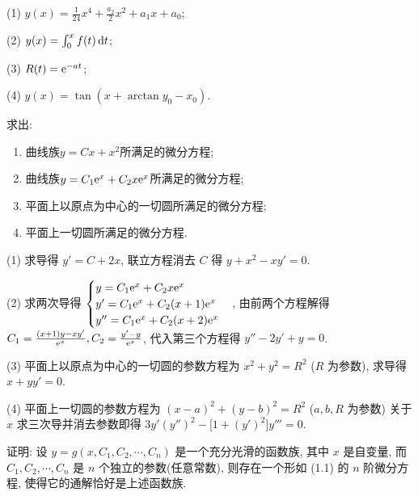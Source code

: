 \begin{solve}
  (1) $y(x)=\frac{1}{24}x^4+\frac{a_2}{2}x^2+a_1x+a_0$;

  (2) $y(x)=\int_0^xf(t)\mathop{}\!\mathrm{d} t$;

  (3) $R(t)=\mathrm{e}^{-at}$;

  (4) $y(x)=\tan(x+\arctan y_0-x_0)$.
\end{solve}



\begin{exercise}
  求出:
  \begin{enumerate}[(1)]
  \item 曲线族$y=Cx+x^2$所满足的微分方程;
  \item 曲线族$y=C_1\mathrm{e}^x+C_2x\mathrm{e}^x$所满足的微分方程;
  \item 平面上以原点为中心的一切圆所满足的微分方程;
  \item 平面上一切圆所满足的微分方程.
  \end{enumerate}
\end{exercise}

\begin{solve}
  (1) 求导得 $y'=C+2x$, 联立方程消去 $C$ 得 $y+x^2-xy'=0$.

  (2) 求两次导得
  $\begin{cases}y=C_1\mathrm{e}^x+C_2x\mathrm{e}^x\\y'=C_1\mathrm{e}^x+C_2(x+1)\mathrm{e}^x\\y''=C_1\mathrm{e}^x+C_2(x+2)\mathrm{e}^x\end{cases}$, 
  由前两个方程解得 $C_1=\frac{(x+1)y-xy'}{\mathrm{e}^x},C_2=\frac{y'-y}{\mathrm{e}^x}$, 
  代入第三个方程得 $y''-2y'+y=0$.

  (3) 平面上以原点为中心的一切圆的参数方程为 $x^2+y^2=R^2$ ($R$ 为参数), 求导得 $x+yy'=0$.

  (4) 平面上一切圆的参数方程为 $(x-a)^2+(y-b)^2=R^2$ ($a,b,R$ 为参数)
  关于 $x$ 求三次导并消去参数即得 $3y'(y'')^2-\bigl[1+(y')^2\bigr]y'''=0$.
\end{solve}



\begin{exercise}
证明: 设 $y=g(x,C_1,C_2,\cdots,C_n)$ 是一个充分光滑的函数族, 其中 $x$ 是自变量, 
而 $C_1, C_2, \cdots, C_n$ 是 $n$ 个独立的参数(任意常数), 则存在一个形如 (1.1) 的 $n$ 阶微分方程, 
使得它的通解恰好是上述函数族.
\end{exercise}

